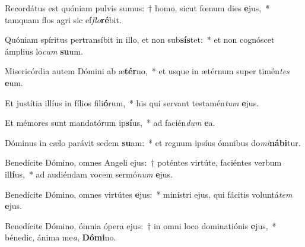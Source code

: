 \item Recordátus est quóniam pulvis sumus:~† homo, sicut fœnum dies \textbf{e}jus,~* tamquam flos agri sic ef\textit{flo}\textbf{ré}bit.
\item Quóniam spíritus pertransíbit in illo, et non sub\textbf{sís}tet:~* et non cognóscet ámplius lo\textit{cum} \textbf{su}um.
\item Misericórdia autem Dómini ab æ\textbf{tér}no,~* et usque in ætérnum super timén\textit{tes} \textbf{e}um.
\item Et justítia illíus in fílios fili\textbf{ó}rum,~* his qui servant testamén\textit{tum} \textbf{e}jus.
\item Et mémores sunt mandatórum ip\textbf{sí}us,~* ad facién\textit{dum} \textbf{e}a.
\item Dóminus in cælo parávit sedem \textbf{su}am:~* et regnum ipsíus ómnibus do\textit{mi}\textbf{ná}\textbf{bi}tur.
\item Benedícite Dómino, omnes Angeli ejus:~† poténtes virtúte, faciéntes verbum il\textbf{lí}us,~* ad audiéndam vocem sermó\textit{num} \textbf{e}jus.
\item Benedícite Dómino, omnes virtútes \textbf{e}jus:~* minístri ejus, qui fácitis voluntá\textit{tem} \textbf{e}jus.
\item Benedícite Dómino, ómnia ópera ejus:~† in omni loco dominatiónis \textbf{e}jus,~* bénedic, ánima me\textit{a}, \textbf{Dó}\textbf{mi}no.
